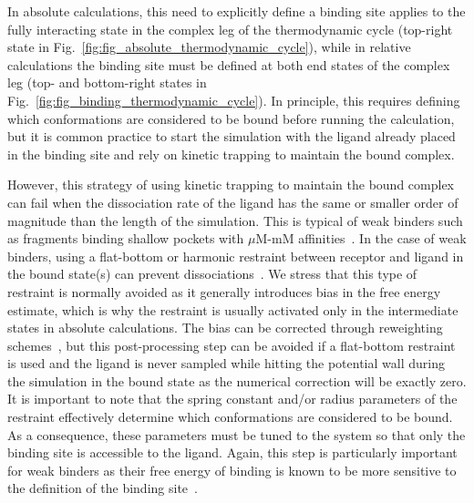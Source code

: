 \documentclass[9pt,bestpractices,pubversion]{livecoms}
\begin{document}
In absolute calculations, this need to explicitly define a binding site applies to the fully interacting state in the complex leg of the thermodynamic cycle (top-right state in Fig.~\ref{fig:fig_absolute_thermodynamic_cycle}), while in relative calculations the binding site must be defined at both end states of the complex leg (top- and bottom-right states in Fig.~\ref{fig:fig_binding_thermodynamic_cycle}).
In principle, this requires defining which conformations are considered to be bound before running the calculation, but it is common practice to start the simulation with the ligand already placed in the binding site and rely on kinetic trapping to maintain the bound complex.

However, this strategy of using kinetic trapping to maintain the bound complex can fail when the dissociation rate of the ligand has the same or smaller order of magnitude than the length of the simulation.
This is typical of weak binders such as fragments binding shallow pockets with $\mu$M-mM affinities~\cite{georgiou2017pushing,pan2017quantitative}.
In the case of weak binders, using a flat-bottom or harmonic restraint between receptor and ligand in the bound state(s) can prevent dissociations~\cite{georgiou2017pushing,rizzi2019sampl6}.
We stress that this type of restraint is normally avoided as it generally introduces bias in the free energy estimate, which is why the restraint is usually activated only in the intermediate states in absolute calculations.
The bias can be corrected through reweighting schemes~\cite{rizzi2019sampl6}, but this post-processing step can be avoided if a flat-bottom restraint is used and the ligand is never sampled while hitting the potential wall during the simulation in the bound state as the numerical correction will be exactly zero.
It is important to note that the spring constant and/or radius parameters of the restraint effectively determine which conformations are considered to be bound.
As a consequence, these parameters must be tuned to the system so that only the binding site is accessible to the ligand.
Again, this step is particularly important for weak binders as their free energy of binding is known to be more sensitive to the definition of the binding site~\cite{gilson1997statisticalthermodynamic}.
\end{document}
